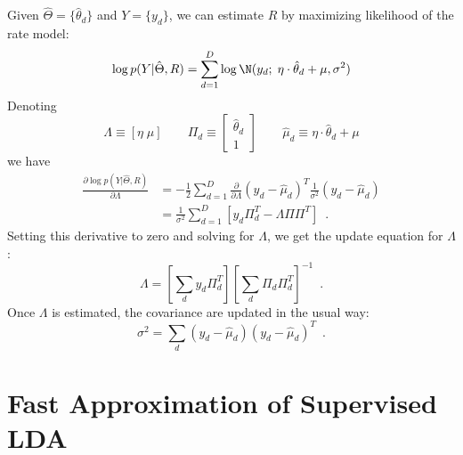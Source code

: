 Given $\hat\Theta=\{\hat\theta_d\}$ and $Y=\{y_d\}$, we can estimate
$R$ by maximizing likelihood of the rate model:
\begin{equation}
  \label{eq:rate-model}
  \log p(Y | \hat\Theta, R) =
  \sum_{d=1}^D \log \N(y_d; \; \eta \cdot \hat\theta_d + \mu, \sigma^2)
\end{equation}
Denoting
\begin{equation}
  \label{eq:convenient-notaitons}
 \Lambda\equiv[\eta\;\mu] \qquad
 \Pi_d\equiv\begin{bmatrix}\hat\theta_d\\1\end{bmatrix} \qquad
 \hat\mu_d \equiv \eta \cdot \hat\theta_d + \mu
\end{equation}
we have
\begin{equation}
  \label{eq:ml-rate-model}
  \begin{split}
  \frac{\partial{\log p(Y | \hat\Theta, R)}}{\partial \Lambda}
  &=
  -\frac{1}{2}
  \sum_{d=1}^D
  \frac{\partial}{\partial \Lambda}
  \left(y_d - \hat\mu_d\right)^T \frac{1}{\sigma^2} \left(y_d - \hat\mu_d\right)
  \\
  &= \frac{1}{\sigma^2} \sum_{d=1}^D \left[ y_d \Pi_d^T - \Lambda\Pi\Pi^T \right]
  \enspace.
  \end{split}
\end{equation}
Setting this derivative to zero and solving for $\Lambda$, we get the
update equation for $\Lambda$:
\begin{equation}
  \label{eq:update-slda-transformer-basis}
  \Lambda = \left[\sum_d y_d\Pi_d^T\right] \left[\sum_d \Pi_d\Pi_d^T\right]^{-1}
  \enspace.
\end{equation}
Once $\Lambda$ is estimated, the covariance are updated in the usual
way:
\begin{equation}
  \label{eq:update-slda-covariance}
  \sigma^2 = \sum_d (y_d-\hat\mu_d)(y_d-\hat\mu_d)^T
  \enspace.
\end{equation}

\section{Fast Approximation of Supervised LDA}

